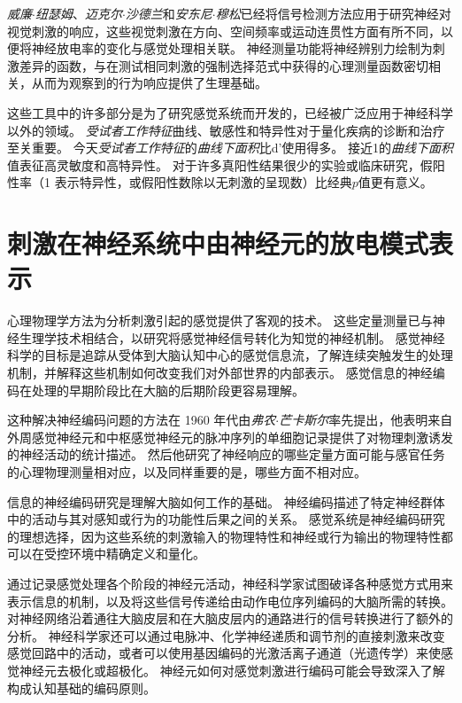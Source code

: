 \begin{proposition}
	\quad \quad \textit{威廉$\cdot$纽瑟姆}、\textit{迈克尔$\cdot$沙德兰}和\textit{安东尼$\cdot$穆松}已经将信号检测方法应用于研究神经对视觉刺激的响应，这些视觉刺激在方向、空间频率或运动连贯性方面有所不同，以便将神经放电率的变化与感觉处理相关联\cite{britten1992analysis}。
	神经测量功能将神经辨别力绘制为刺激差异的函数，与在测试相同刺激的强制选择范式中获得的心理测量函数密切相关，从而为观察到的行为响应提供了生理基础。
	
	\quad \quad 这些工具中的许多部分是为了研究感觉系统而开发的，已经被广泛应用于神经科学以外的领域。
	\textit{受试者工作特征}曲线、敏感性和特异性对于量化疾病的诊断和治疗至关重要。
	今天\textit{受试者工作特征}的\textit{曲线下面积}比d'使用得多。
	接近1的\textit{曲线下面积}值表征高灵敏度和高特异性。
	对于许多真阳性结果很少的实验或临床研究，假阳性率（1 表示特异性，或假阳性数除以无刺激的呈现数）比经典$ p $值更有意义。
	
\end{proposition}



\section{刺激在神经系统中由神经元的放电模式表示}
心理物理学方法为分析刺激引起的感觉提供了客观的技术。 
这些定量测量已与神经生理学技术相结合，以研究将感觉神经信号转化为知觉的神经机制。 
感觉神经科学的目标是追踪从受体到大脑认知中心的感觉信息流，了解连续突触发生的处理机制，并解释这些机制如何改变我们对外部世界的内部表示。
感觉信息的神经编码在处理的早期阶段比在大脑的后期阶段更容易理解。


这种解决神经编码问题的方法在 1960 年代由\textit{弗农$\cdot$芒卡斯尔}率先提出，他表明来自外周感觉神经元和中枢感觉神经元的脉冲序列的单细胞记录提供了对物理刺激诱发的神经活动的统计描述\cite{mountcastle1966neural}。
然后他研究了神经响应的哪些定量方面可能与感官任务的心理物理测量相对应，以及同样重要的是，哪些方面不相对应。


信息的神经编码研究是理解大脑如何工作的基础。
神经编码描述了特定神经群体中的活动与其对感知或行为的功能性后果之间的关系。
感觉系统是神经编码研究的理想选择，因为这些系统的刺激输入的物理特性和神经或行为输出的物理特性都可以在受控环境中精确定义和量化。


通过记录感觉处理各个阶段的神经元活动，神经科学家试图破译各种感觉方式用来表示信息的机制，以及将这些信号传递给由动作电位序列编码的大脑所需的转换。 
对神经网络沿着通往大脑皮层和在大脑皮层内的通路进行的信号转换进行了额外的分析。 
神经科学家还可以通过电脉冲、化学神经递质和调节剂的直接刺激来改变感觉回路中的活动，或者可以使用基因编码的光激活离子通道（光遗传学）来使感觉神经元去极化或超极化。 
神经元如何对感觉刺激进行编码可能会导致深入了解构成认知基础的编码原则。


